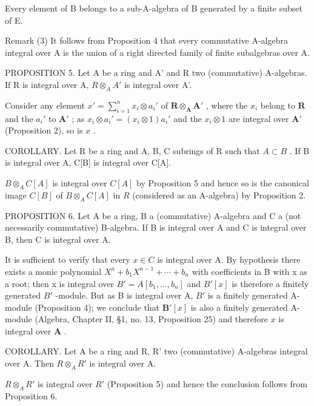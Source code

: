 Every element of B belongs to a sub-A-algebra of B generated by a finite subset of E.

Remark (3) It follows from Proposition 4 that every commutative A-algebra integral over A is the union of a right directed family of finite subalgebras over A.

PROPOSITION 5. Let A be a ring and A' and R two (commutative) A-algebras. If R is integral over A, \(R \otimes_{A} A'\) is integral over A'.

Consider any element \(x' = \sum_{i=1}^{n} x_i \otimes a_i'\) of \(\mathbf{R} \otimes_{\mathbf{A}} \mathbf{A}'\) , where the \(x_i\) belong to \(\mathbf{R}\) and the \(a_i'\) to \(\mathbf{A}'\) ; as \(x_i \otimes a_i' = (x_i \otimes 1)a_i'\) and the \(x_i \otimes 1\) are integral over \(\mathbf{A}'\) (Proposition 2), so is \(x\) .

COROLLARY. Let R be a ring and A, B, C subrings of R such that \(A \subset B\) . If B is integral over A, C{[}B{]} is integral over C{[}A{]}.

\(B \otimes_{A} C[A]\) is integral over \(C[A]\) by Proposition 5 and hence so is the canonical image \(C[B]\) of \(B \otimes_{A} C[A]\) in \(R\) (considered as an A-algebra) by Proposition 2.

PROPOSITION 6. Let A be a ring, B a (commutative) A-algebra and C a (not necessarily commutative) B-algebra. If B is integral over A and C is integral over B, then C is integral over A.

It is sufficient to verify that every \(x \in C\) is integral over A. By hypothesis there exists a monic polynomial \(X^{n} + b_{1}X^{n-1} + \cdots + b_{n}\) with coefficients in B with x as a root; then x is integral over \(B' = A[b_{1}, \ldots, b_{n}]\) and \(B'[x]\) is therefore a finitely generated \(B'\) -module. But as B is integral over A, \(B'\) is a finitely generated A-module (Proposition 4); we conclude that \(\mathbf{B}'[x]\) is also a finitely generated A-module (Algebra, Chapter II, §1, no. 13, Proposition 25) and therefore \(x\) is integral over \(\mathbf{A}\) .

COROLLARY. Let A be a ring and R, R' two (commutative) A-algebras integral over A. Then \(R \otimes_{A} R'\) is integral over A.

\(R \otimes_{A} R'\) is integral over \(R'\) (Proposition 5) and hence the conclusion follows from Proposition 6.

